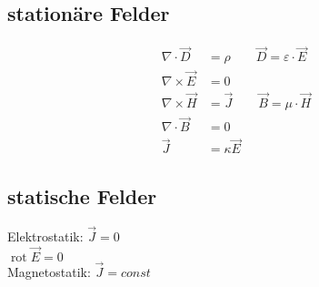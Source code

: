 \subsection{stationäre Felder}

\begin{align*}
    \nabla \cdot \vec{D}  & = \rho \qquad \vec{D} = \varepsilon \cdot \vec{E} \\
    \nabla \times \vec{E} & = 0                                               \\
    \nabla \times \vec{H} & = \vec{J} \qquad \vec{B} = \mu \cdot \vec{H}      \\
    \nabla \cdot \vec{B}  & = 0                                               \\
    \vec{J}               & = \kappa \vec{E}
\end{align*}

\subsection{statische Felder}
Elektrostatik: $\vec{J} = 0$\\
$\operatorname{rot} \vec{E} = 0$\\
Magnetostatik: $\vec{J} = const$
